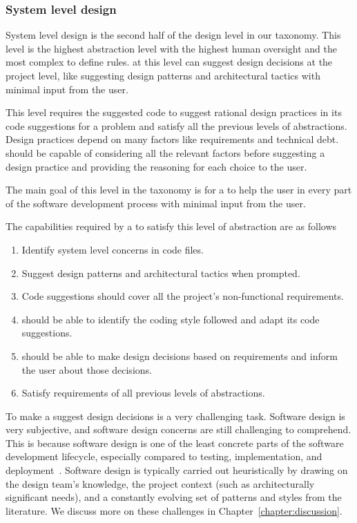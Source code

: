 \subsubsection{System level design}
\label{high_design}
System level design is the second half of the design level in our taxonomy. This level is the highest abstraction level with the highest human oversight and the most complex to define rules.
\cct{} at this level can suggest design decisions at the project level, like suggesting design patterns and architectural tactics with minimal input from the user.

This level requires the suggested code to suggest rational design practices in its code suggestions for a problem and satisfy all the previous levels of abstractions. Design practices depend on many factors like requirements and technical debt. \cct{} should be capable of considering all the relevant factors before suggesting a design practice and providing the reasoning for each choice to the user.

The main goal of this level in the taxonomy is for a \cct{} to help the user in every part of the software development process with minimal input from the user.

The capabilities required by a \cct{} to satisfy this level of abstraction are as follows
\begin{enumerate}
    \item Identify system level concerns in code files.
    \item Suggest design patterns and architectural tactics when prompted.
    \item Code suggestions should cover all the project's non-functional requirements.
    \item \cct{} should be able to identify the coding style followed and adapt its code suggestions.
    \item \cct{} should be able to make design decisions based on requirements and inform the user about those decisions.
    \item Satisfy requirements of all previous levels of abstractions.
\end{enumerate}

To make a \cct{} suggest design decisions is a very challenging task. 
Software design is very subjective, and software design concerns are still challenging to comprehend. 
This is because software design is one of the least concrete parts of the software development lifecycle, especially compared to testing, implementation, and deployment~\cite{sedesign}. 
Software design is typically carried out heuristically by drawing on the design team's knowledge, the project context (such as architecturally significant needs), and a constantly evolving set of patterns and styles from the literature. We discuss more on these challenges in Chapter~\ref{chapter:discussion}.